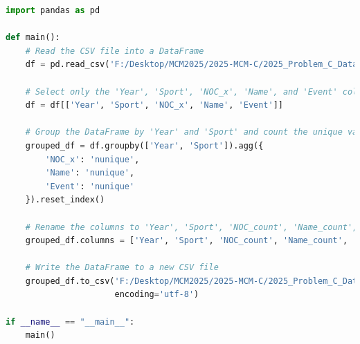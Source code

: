 \documentclass[12pt]{article}
\begin{document}
\begin{lstlisting}[language=Python, style=mystyle, caption=calculate\_lots\_of\_number.py]
import pandas as pd

def main():
    # Read the CSV file into a DataFrame
    df = pd.read_csv('F:/Desktop/MCM2025/2025-MCM-C/2025_Problem_C_Data/summerOly_athletes_v3.0.csv')

    # Select only the 'Year', 'Sport', 'NOC_x', 'Name', and 'Event' columns
    df = df[['Year', 'Sport', 'NOC_x', 'Name', 'Event']]

    # Group the DataFrame by 'Year' and 'Sport' and count the unique values in 'NOC_x', 'Name', and 'Event' columns
    grouped_df = df.groupby(['Year', 'Sport']).agg({
        'NOC_x': 'nunique',
        'Name': 'nunique',
        'Event': 'nunique'
    }).reset_index()

    # Rename the columns to 'Year', 'Sport', 'NOC_count', 'Name_count', and 'Event_count'
    grouped_df.columns = ['Year', 'Sport', 'NOC_count', 'Name_count', 'Event_count']

    # Write the DataFrame to a new CSV file
    grouped_df.to_csv('F:/Desktop/MCM2025/2025-MCM-C/2025_Problem_C_Data/country_athlete_event_number.csv', index=False,
                      encoding='utf-8')
                      
if __name__ == "__main__":
    main()
\end{lstlisting}
\end{document}

